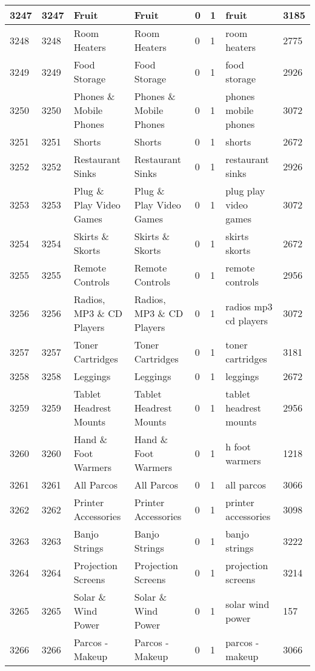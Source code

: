 \begin{longtable}{|l|l|l|l|l|l|l|l|}
3247 & 3247 & Fruit & Fruit & 0 & 1 & fruit & 3185 \\ \hline 
3248 & 3248 & Room Heaters & Room Heaters & 0 & 1 & room heaters & 2775 \\ \hline 
3249 & 3249 & Food Storage & Food Storage & 0 & 1 & food storage & 2926 \\ \hline 
3250 & 3250 & Phones \& Mobile Phones & Phones \& Mobile Phones & 0 & 1 & phones mobile phones & 3072 \\ \hline 
3251 & 3251 & Shorts & Shorts & 0 & 1 & shorts & 2672 \\ \hline 
3252 & 3252 & Restaurant Sinks & Restaurant Sinks & 0 & 1 & restaurant sinks & 2926 \\ \hline 
3253 & 3253 & Plug \& Play Video Games & Plug \& Play Video Games & 0 & 1 & plug play video games & 3072 \\ \hline 
3254 & 3254 & Skirts \& Skorts & Skirts \& Skorts & 0 & 1 & skirts skorts & 2672 \\ \hline 
3255 & 3255 & Remote Controls & Remote Controls & 0 & 1 & remote controls & 2956 \\ \hline 
3256 & 3256 & Radios, MP3 \& CD Players & Radios, MP3 \& CD Players & 0 & 1 & radios mp3 cd players & 3072 \\ \hline 
3257 & 3257 & Toner Cartridges & Toner Cartridges & 0 & 1 & toner cartridges & 3181 \\ \hline 
3258 & 3258 & Leggings & Leggings & 0 & 1 & leggings & 2672 \\ \hline 
3259 & 3259 & Tablet Headrest Mounts & Tablet Headrest Mounts & 0 & 1 & tablet headrest mounts & 2956 \\ \hline 
3260 & 3260 & Hand \& Foot Warmers & Hand \& Foot Warmers & 0 & 1 & h foot warmers & 1218 \\ \hline 
3261 & 3261 & All Parcos & All Parcos & 0 & 1 & all parcos & 3066 \\ \hline 
3262 & 3262 & Printer Accessories & Printer Accessories & 0 & 1 & printer accessories & 3098 \\ \hline 
3263 & 3263 & Banjo Strings & Banjo Strings & 0 & 1 & banjo strings & 3222 \\ \hline 
3264 & 3264 & Projection Screens & Projection Screens & 0 & 1 & projection screens & 3214 \\ \hline 
3265 & 3265 & Solar \& Wind Power & Solar \& Wind Power & 0 & 1 & solar wind power & 157 \\ \hline 
3266 & 3266 & Parcos - Makeup & Parcos - Makeup & 0 & 1 & parcos - makeup & 3066 \\ \hline 

\end{longtable}
